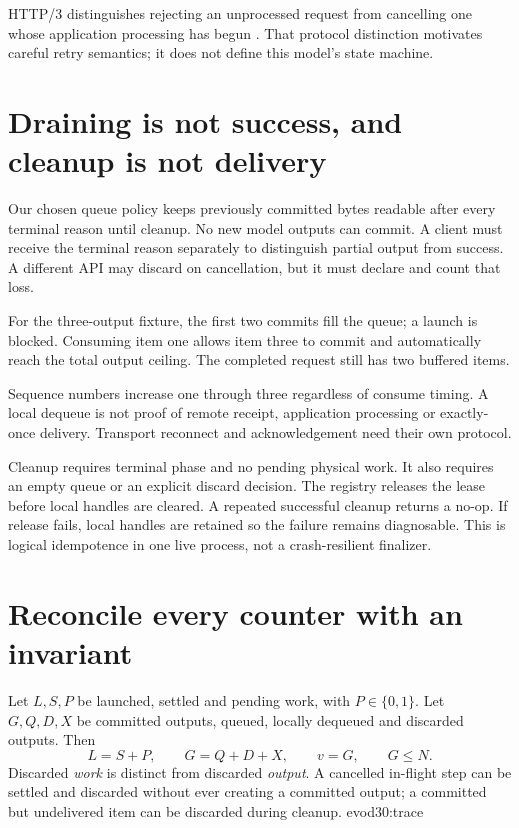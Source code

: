 HTTP/3 distinguishes rejecting an unprocessed request from cancelling one whose
application processing has begun \cite{evod30:http3}. That protocol distinction
motivates careful retry semantics; it does not define this model's state machine.

\section{Draining is not success, and cleanup is not delivery}
Our chosen queue policy keeps previously committed bytes readable after every
terminal reason until cleanup. No new model outputs can commit. A client must
receive the terminal reason separately to distinguish partial output from success.
A different API may discard on cancellation, but it must declare and count that loss.

For the three-output fixture, the first two commits fill the queue; a launch is
blocked. Consuming item one allows item three to commit and automatically reach
the total output ceiling. The completed request still has two buffered items.
\begin{center}\end{center}
Sequence numbers increase one through three regardless of consume timing.
A local dequeue is not proof of remote receipt, application processing or exactly-once
delivery. Transport reconnect and acknowledgement need their own protocol.

\par\medskip\noindent\begin{minipage}{\linewidth}
\end{minipage}\par\medskip
Cleanup requires terminal phase and no pending physical work. It also requires
an empty queue or an explicit discard decision. The registry releases the lease
before local handles are cleared. A repeated successful cleanup returns a no-op.
If release fails, local handles are retained so the failure remains diagnosable.
This is logical idempotence in one live process, not a crash-resilient finalizer.

\section{Reconcile every counter with an invariant}
Let $L,S,P$ be launched, settled and pending work, with $P\in\{0,1\}$.
Let $G,Q,D,X$ be committed outputs, queued, locally dequeued and discarded outputs.
Then
\[
 L=S+P,\qquad G=Q+D+X,\qquad v=G,\qquad G\le N.
\]
Discarded \emph{work} is distinct from discarded \emph{output}.
A cancelled in-flight step can be settled and discarded without ever creating
a committed output; a committed but undelivered item can be discarded during cleanup.
{evod30:trace}

